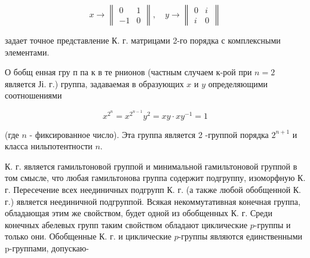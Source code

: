 \documentclass[10pt]{article}
\begin{document}
\[

x \rightarrow\left\|\begin{array}{rr}

0 & 1 \\

-1 & 0

\end{array}\right\|, \quad y \rightarrow\left\|\begin{array}{ll}

0 & i \\

i & 0

\end{array}\right\|

\]



задает точное представление К. г. матрицами 2-го порядка с комплексными элементами.



О бобщ енная гру п па к в те рнионов (частным случаем к-рой при $n=2$ является Јі. г.) группа, задаваемая в образующих $x$ и $y$ определяющими соотношениями



\[

x^{2^{n}}=x^{2^{n-1}} y^{2}=x y \cdot x y^{-1}=1

\]



(где $n$ - фиксированное число). Эта группа является 2 -группой порядка $2^{n+1}$ и класса нильпотентности $n$.



К. г. является гамильтоновой группой и минимальной гамильтоновой группой в том смысле, что любая гамильтонова группа содержит подгруппу, изоморфную К. г. Пересечение всех неединичных подгрупп К. г. (а также любой обобщенной К. г.) является неединичной подгруппой. Всякая некоммутативная конечная группа, обладающая этим же свойством, будет одной из обобщенных К. г. Среди конечных абелевых групп таким свойством обладают циклические $p$-группы и только они. Обобщенные К. г. и циклические $p$-группы являются единственными p-группами, допускаю-
\end{document}
